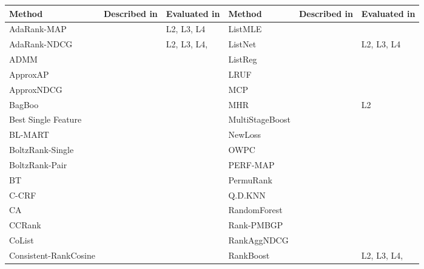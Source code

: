\documentclass{sig-alternate}
\begin{document}
\label{app:ltr_methods_used}
\label{app:raw_data}
\begin{table}[!hpt]
\scriptsize{
\begin{tabular}{lll|lll}\toprule
Method & Described in & Evaluated in & Method & Described in & Evaluated in\\
\midrule
AdaRank-MAP & \cite{Xu2007} & L2, L3, L4 & ListMLE & \cite{Xia2008} & \cite{Lin2010, Lin2011, Gao2014} \\
AdaRank-NDCG & \cite{Xu2007} & L2, L3, L4,  \cite{Busa-Fekete2013,Tan2013} & ListNet & \cite{Cao2007} & L2, L3, L4 \\ 
ADMM & \cite{Duh2011} & \cite{Duh2011} & ListReg & \cite{Wu2011} & \cite{Wu2011} \\ 
ApproxAP & \cite{Qin2010b} & \cite{Qin2010b} & LRUF & \cite{Torkestani2012b} & \cite{Torkestani2012b} \\ 
ApproxNDCG & \cite{Qin2010b} & \cite{Qin2010b} & MCP & \cite{Laporte2013} & \cite{Laporte2013} \\ 
BagBoo & \cite{Pavlov2010} & \cite{Ganjisaffar2011c} & MHR & \cite{Qin2007} & L2 \\ 
Best Single Feature &  & \cite{Gomes2013} &  MultiStageBoost & \cite{Kao2013} & \cite{Kao2013} \\ 
BL-MART & \cite{Ganjisaffar2011c} & \cite{Ganjisaffar2011c} &  NewLoss & \cite{Peng2010} & \cite{Peng2010} \\ 
BoltzRank-Single & \cite{Volkovs2009} & \cite{Volkovs2009, Volkovs2013} & OWPC & \cite{Usunier2009} & \cite{Usunier2009} \\ 
BoltzRank-Pair & \cite{Volkovs2009} & \cite{Volkovs2009, Ganjisaffar2011c, Volkovs2013} & PERF-MAP & \cite{Pan2011} & \cite{Torkestani2012b} \\ 
BT & \cite{Zhou2008} & \cite{Zhou2008} & PermuRank & \cite{Xu2008} & \cite{Xu2008} \\ 
C-CRF & \cite{Qin2008b} & \cite{Qin2008b} & Q.D.KNN & \cite{Geng2008} & \cite{Wang2013} \\ 
CA & \cite{Metzler2007} & \cite{Busa-Fekete2013,Tan2013} & RandomForest & \cite{Gomes2013} & \cite{Gomes2013} \\ 
CCRank & \cite{Wang2011c} & \cite{Wang2011c} & Rank-PMBGP & \cite{Sato2013} & \cite{Sato2013} \\ 
CoList & \cite{Gao2014} & \cite{Gao2014} & RankAggNDCG & \cite{Wang2013} & \cite{Wang2013} \\
Consistent-RankCosine & \cite{Ravikumar2011} & \cite{Tan2013} & RankBoost & \cite{Freund2003} & L2, L3, L4, \cite{Busa-Fekete2013, Alcantara2010, Sato2013} \\

\end{tabular}}
\end{table}
\end{document}
